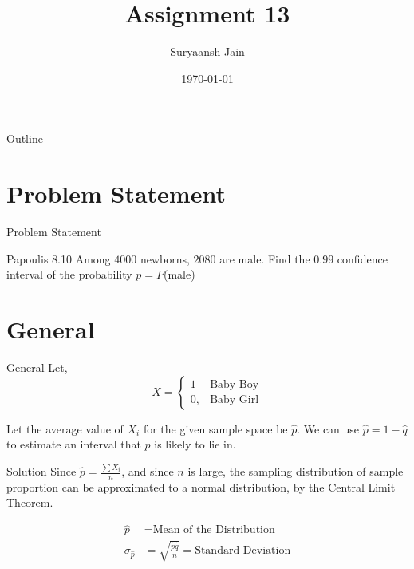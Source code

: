 \documentclass{beamer}
\title{Assignment 13}
\author{Suryaansh Jain}
\date{\today}
\begin{document}
\begin{frame}
    \titlepage 
\end{frame}

\logo{}

\begin{frame}{Outline}
    \tableofcontents
\end{frame}

\section{Problem Statement}
\begin{frame}{Problem Statement}
    \begin{block}{Papoulis 8.10} Among $4000$ newborns, $2080$ are male. Find the $0.99$ confidence interval of the probability
$p = P$(male) \end{block}
\end{frame}

\section{General}
\begin{frame}{General}
 Let,
 \begin{equation}
     X = \begin{cases}
        1 & \text{Baby Boy} \\
        0, & \text{Baby Girl}
    \end{cases}
 \end{equation}
 
 Let the average value of $X_i$ for the given sample space be $\hat{p}$. We can use $\hat{p} = 1 - \hat{q}$ to estimate an interval that $p$ is likely to lie in.
\end{frame}

\begin{frame}{Solution}
 Since $\hat{p} = \frac{\sum X_i}{n}$, and since $n$ is large, the sampling distribution of sample proportion can be approximated to a normal distribution, by the Central Limit Theorem.
 
 \begin{align}
     \hat{p} &= \text{Mean of the Distribution} \\
     \sigma_{\hat{p}} &= \sqrt{\frac{\hat{p} \hat{q}}{n}} = \text{Standard Deviation}
 \end{align}
\end{frame}
\end{document}
